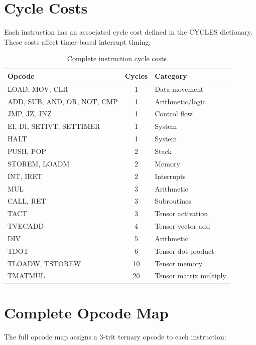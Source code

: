 \documentclass[12pt,a4paper,twoside]{book}
\theoremstyle{trinarytheorem}
\theoremstyle{trinarydefinition}
\newcommand{\code}[1]{\textsf{#1}}
\begin{document}
\section{Cycle Costs}

Each instruction has an associated cycle cost defined in the \code{CYCLES} dictionary.
These costs affect timer-based interrupt timing:

\begin{table}[H]
\centering
\caption{Complete instruction cycle costs}
\label{tab:allcycles}
\begin{tabular}{lcl}
\toprule
Opcode & Cycles & Category \\
\midrule
LOAD, MOV, CLR & 1 & Data movement \\
ADD, SUB, AND, OR, NOT, CMP & 1 & Arithmetic/logic \\
JMP, JZ, JNZ & 1 & Control flow \\
EI, DI, SETIVT, SETTIMER & 1 & System \\
HALT & 1 & System \\
PUSH, POP & 2 & Stack \\
STOREM, LOADM & 2 & Memory \\
INT, IRET & 2 & Interrupts \\
MUL & 3 & Arithmetic \\
CALL, RET & 3 & Subroutines \\
TACT & 3 & Tensor activation \\
TVECADD & 4 & Tensor vector add \\
DIV & 5 & Arithmetic \\
TDOT & 6 & Tensor dot product \\
TLOADW, TSTOREW & 10 & Tensor memory \\
TMATMUL & 20 & Tensor matrix multiply \\
\bottomrule
\end{tabular}
\end{table}

\section{Complete Opcode Map}

The full opcode map assigns a 3-trit ternary opcode to each instruction:
\end{document}
